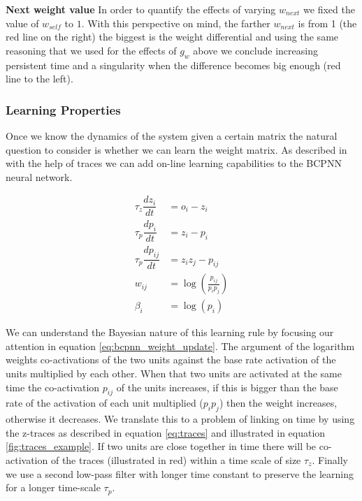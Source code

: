 \documentclass[10pt,a4paper]{article}
\begin{document}
\textbf{Next weight value}
In order to quantify the effects of varying $w_{next}$ we fixed the value of $w_{self}$ to $1$. With this perspective on mind, the farther $w_{next}$ is from 1 (the red line on the right) the biggest is the weight differential and using the same reasoning that we used for the effects of $g_w$ above we conclude increasing persistent time and a singularity when the difference becomes big enough (red line to the left). 

\subsubsection{Learning Properties}
Once we know the dynamics of the system given a certain matrix the natural question to consider is whether we can learn the weight matrix. As described in \cite{sandberg2002bayesian} with the help of traces we can add on-line learning capabilities to the BCPNN neural network. 

\begin{align}
\tau_z \dfrac{dz_i}{dt} &= o_i - z_i \label{eq:traces}\\
\tau_p \dfrac{dp_i}{dt} &= z_i - p_i  \label{eq:traces_probability} \\  
\tau_p \dfrac{dp_{ij}}{dt} &= z_i z_j - p_{ij} \\
w_{ij} &= \log(\frac{p_{ij}}{p_i p_j}) \label{eq:bcpnn_weight_update} \\
\beta_i &= \log(p_i) 
\end{align}

We can understand the Bayesian nature of this learning rule by focusing our attention in equation \ref{eq:bcpnn_weight_update}. The argument of the logarithm weights co-activations of the two units against the base rate activation of the units multiplied by each other. When that two units are activated at the same time the co-activation $p_{ij}$ of the units increases, if this is bigger than the  base rate of the activation of each unit multiplied ($p_i p_j$) then the weight increases, otherwise it decreases. We translate this to a problem of linking on time by using the z-traces as described in equation \ref{eq:traces} and illustrated in equation \ref{fig:traces_example}. If two units are close together in time there will be co-activation of the traces (illustrated in red) within a time scale of size $\tau_z$. Finally  we use a second low-pass filter  with longer time constant to preserve the learning for a longer time-scale $\tau_p$. 
\end{document}
